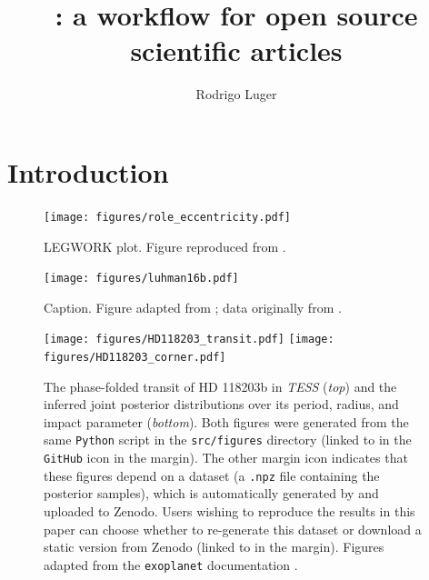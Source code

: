 \documentclass[twocolumn]{aastex631}
\begin{document}
\title{\showyourwork: a workflow for open source scientific articles}

\author[0000-0002-0296-3826]{Rodrigo Luger}

\begin{abstract}
    \blindtext
\end{abstract}

\section{Introduction}

\begin{figure}[ht!]
    \begin{centering}
        \texttt{[image: figures/role\_eccentricity.pdf]}
        \caption{
            LEGWORK plot. Figure reproduced from \citet{Wagg2021}.
        }
        \label{fig:role_eccentricity}
    \end{centering}
\end{figure}

\begin{figure}[ht!]
    \begin{centering}
        \texttt{[image: figures/luhman16b.pdf]}
        \caption{
            Caption. Figure adapted from \citet{Luger2021}; data originally from \citet{Crossfield2014}.
        }
        \label{fig:luhman16b}
    \end{centering}
\end{figure}

\begin{figure}[ht!]
    \begin{centering}
        \texttt{[image: figures/HD118203\_transit.pdf]}
        \texttt{[image: figures/HD118203\_corner.pdf]}
        \caption{
            The phase-folded transit of HD 118203b in \emph{TESS} (\emph{top}) and the inferred joint posterior distributions over its period, radius, and impact parameter (\emph{bottom}). 
            Both figures were generated from the same \texttt{Python} script in the \texttt{src/figures} directory (linked to in the \texttt{GitHub} icon in the margin). The other margin icon indicates that these figures depend on a dataset (a \texttt{.npz} file containing the posterior samples), which is automatically generated by \showyourwork and uploaded to Zenodo. 
            Users wishing to reproduce the results in this paper can choose whether to re-generate this dataset or download a static version from Zenodo (linked to in the margin).
            Figures adapted from the \texttt{exoplanet} documentation \citep{ForemanMackey2021}.
        }
        \label{fig:HD118203}
    \end{centering}
\end{figure}
\end{document}

